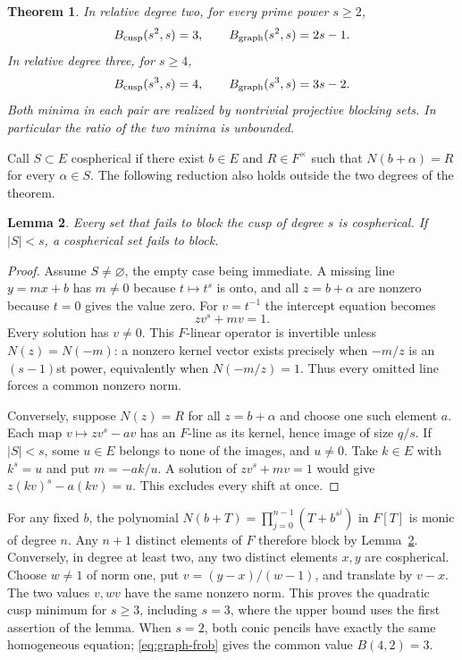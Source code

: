 \documentclass[preprint,12pt,numbers]{elsarticle}
\newtheorem{theorem}{Theorem}[section]
\newtheorem{lemma}[theorem]{Lemma}
\begin{document}
\begin{theorem}\label{thm:sphere-minimum}
In relative degree two, for every prime power $s\ge2$,
\[
   B_{\rm cusp}(s^2,s)=3,\qquad B_{\rm graph}(s^2,s)=2s-1 .
\]
In relative degree three, for $s\ge4$,
\[
   B_{\rm cusp}(s^3,s)=4,\qquad B_{\rm graph}(s^3,s)=3s-2 .
\]
Both minima in each pair are realized by nontrivial projective blocking
sets. In particular the ratio of the two minima is unbounded.
\end{theorem}

Call $S\subset E$ cospherical if there exist $b\in E$ and
$R\in F^\times$ such that $N(b+\alpha)=R$ for every $\alpha\in S$.
The following reduction also holds outside the two degrees of the theorem.

\begin{lemma}\label{lem:cospherical}
Every set that fails to block the cusp of degree $s$ is cospherical.
If $|S|<s$, a cospherical set fails to block.
\end{lemma}
\begin{proof}
Assume $S\ne\varnothing$, the empty case being immediate. A missing
line $y=mx+b$ has $m\ne0$ because $t\mapsto t^s$ is onto, and all
$z=b+\alpha$ are nonzero because $t=0$ gives the value zero. For
$v=t^{-1}$ the intercept equation becomes
\[
                     zv^s+mv=1.
\]
Every solution has $v\ne0$. This $F$-linear operator is invertible
unless $N(z)=N(-m)$: a nonzero kernel vector exists precisely when
$-m/z$ is an $(s-1)$st power, equivalently when $N(-m/z)=1$.
Thus every omitted line forces a common nonzero norm.

Conversely, suppose $N(z)=R$ for all $z=b+\alpha$ and choose one such
element $a$. Each map $v\mapsto zv^s-av$ has an $F$-line as its
kernel, hence image of size $q/s$. If $|S|<s$, some $u\in E$ belongs to
none of the images, and $u\ne0$. Take $k\in E$ with $k^s=u$ and put
$m=-ak/u$. A solution of $zv^s+mv=1$ would give
$z(kv)^s-a(kv)=u$. This excludes every shift at once.
\end{proof}

For any fixed $b$, the polynomial $N(b+T)=\prod_{j=0}^{n-1}
(T+b^{s^j})$ in $F[T]$ is monic of degree $n$. Any $n+1$ distinct
elements of $F$ therefore block by Lemma~\ref{lem:cospherical}.
Conversely, in degree at least two, any two distinct elements $x,y$
are cospherical. Choose $w\ne1$ of norm one, put $v=(y-x)/(w-1)$,
and translate by $v-x$. The two values $v,wv$ have the same nonzero norm.
This proves the quadratic cusp minimum for $s\ge3$, including $s=3$,
where the upper bound uses the first assertion of the lemma. When
$s=2$, both conic pencils have exactly the same homogeneous equation;
\eqref{eq:graph-frob} gives the common value $B(4,2)=3$.
\end{document}
